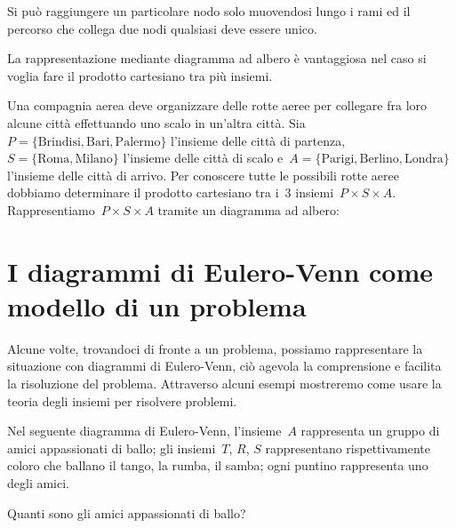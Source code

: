{Si può raggiungere un particolare nodo solo muovendosi lungo i rami ed
il percorso che collega due nodi qualsiasi deve essere unico.

La rappresentazione mediante diagramma ad albero è vantaggiosa nel
caso si voglia fare il prodotto cartesiano tra più insiemi.
\begin{center}

\end{center}

\begin{exrig}
 \begin{esempio}
 Una compagnia aerea deve organizzare delle rotte aeree per collegare fra 
 loro alcune città effettuando uno scalo in un'altra città. 
 Sia~$P=\{\text{Brindisi},\text{Bari},\text{Palermo}\}$ l'insieme delle città 
 di partenza, $S=\{\text{Roma},\text{Milano}\}$ l'insieme delle città di
 scalo e~$A=\{\text{Parigi},\text{Berlino},\text{Londra}\}$ l'insieme delle 
 città di arrivo. Per conoscere tutte le possibili rotte aeree dobbiamo
determinare il prodotto cartesiano tra i~3 insiemi~$P\times S\times A$.
Rappresentiamo~$P\times S\times A$ tramite un diagramma ad albero:

\begin{center}

\end{center}
 \end{esempio}
\end{exrig}

\section{I diagrammi di Eulero-Venn come modello di un problema}
\label{sec:insiemi_problemi}

Alcune volte, trovandoci di fronte a un problema, possiamo rappresentare
la situazione con diagrammi di Eulero-Venn, ciò agevola la
comprensione e facilita la risoluzione del problema. Attraverso alcuni
esempi mostreremo come usare la teoria degli insiemi per risolvere
problemi.

\begin{exrig}
 \begin{esempio}
Nel seguente diagramma di Eulero-Venn, l'insieme~$A$ rappresenta un gruppo di 
amici appassionati di ballo; gli insiemi~$T$, $R$,
$S$ rappresentano rispettivamente coloro che ballano il tango, la rumba, il 
samba; ogni puntino rappresenta uno degli amici.
\begin{multicols}{2}
Quanti sono gli amici appassionati di ballo?


\end{multicols}
\end{esempio}
\end{exrig}}
